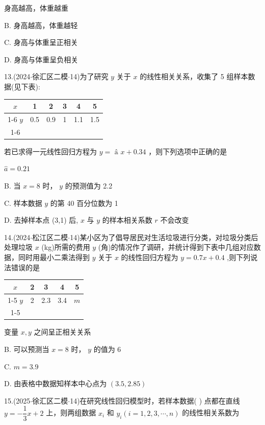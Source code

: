 \xx{}{}{}{}身高越高，体重越重

B. 身高越高，体重越轻

C. 身高与体重呈正相关

D. 身高与体重呈负相关

13.(2024$\cdot$徐汇区二模$\cdot$14)为了研究 $y$ 关于 $x$ 的线性相关关系，收集了 5 组样本数据(见下表):

\begin{center}

\begin{tabular}{|c|c|c|c|c|c|}
\hline
$x$ & 1 & 2 & 3 & 4 & 5 \\
\cline{1-6}
$y$ & 0.5 & 0.9 & 1 & 1.1 & 1.5 \\
\cline{1-6}
\hline
\end{tabular}
\end{center}

若已求得一元线性回归方程为 $y = {\text{ â }x} + {0.34}$ ，则下列选项中正确的是 \dotfill{(\kh{})}

\xx{}{}{}{}$\widehat{a} = {0.21}$

B. 当 $x = 8$ 时， $y$ 的预测值为 2.2

C. 样本数据 $y$ 的第 40 百分位数为 1

D. 去掉样本点 (3,1) 后, $x$ 与 $y$ 的样本相关系数 $r$ 不会改变

14.(2024$\cdot$松江区二模$\cdot$14)某小区为了倡导居民对生活垃圾进行分类，对垃圾分类后处理垃圾 $x$ (kg)所需的费用 $y$ (角)的情况作了调研，并统计得到下表中几组对应数据，同时用最小二乘法得到 $y$ 关于 $x$ 的线性回归方程为 $y = {0.7x} + {0.4}$ ,则下列说法错误的是 \dotfill{(\kh{})}

\begin{center}

\begin{tabular}{|c|c|c|c|c|}
\hline
$x$ & 2 & 3 & 4 & 5 \\
\cline{1-5}
$y$ & 2 & 2.3 & 3.4 & $m$ \\
\cline{1-5}
\hline
\end{tabular}
\end{center}

\xx{}{}{}{}变量 $x,y$ 之间呈正相关关系

B. 可以预测当 $x = 8$ 时， $y$ 的值为 6

C. $m = {3.9}$

D. 由表格中数据知样本中心点为 $\left( {{3.5},{2.85}}\right)$

15.(2025$\cdot$徐汇区二模$\cdot$14)在研究线性回归模型时，若样本数据(  ) 点都在直线 $y =  - \dfrac{1}{3}x + 2$ 上，则两组数据 ${x}_{i}$ 和 ${y}_{i}\left( {i = 1,2,3,\cdots ,n}\right)$ 的线性相关系数为\dotfill{(\kh{})}

